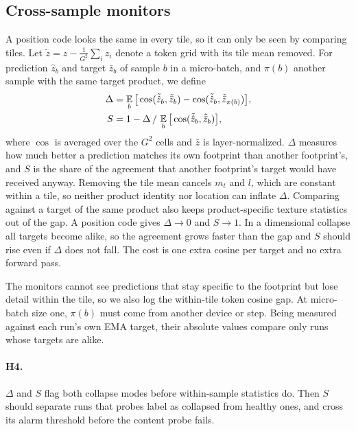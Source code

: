 \subsection{Cross-sample monitors}
\label{sec:monitor}

A position code looks the same in every tile, so it can only be seen by comparing tiles. Let $\tilde z = z - \frac{1}{G^2}\sum_i z_i$ denote a token grid with its tile mean removed. For prediction $\hat z_b$ and target $\bar z_b$ of sample $b$ in a micro-batch, and $\pi(b)$ another sample with the same target product, we define
\begin{align}
  \Delta &= \operatorname*{\mathbb{E}}_b\big[\cos(\tilde{\hat z}_b, \tilde{\bar z}_b) - \cos(\tilde{\hat z}_b, \tilde{\bar z}_{\pi(b)})\big], \label{eq:gap}\\
  S &= 1 - \Delta \,/\, \operatorname*{\mathbb{E}}_b\big[\cos(\tilde{\hat z}_b, \tilde{\bar z}_b)\big], \label{eq:share}
\end{align}
where $\cos$ is averaged over the $G^2$ cells and $\bar z$ is layer-normalized. $\Delta$ measures how much better a prediction matches its own footprint than another footprint's, and $S$ is the share of the agreement that another footprint's target would have received anyway. Removing the tile mean cancels $m_t$ and $l$, which are constant within a tile, so neither product identity nor location can inflate $\Delta$. Comparing against a target of the same product also keeps product-specific texture statistics out of the gap. A position code gives $\Delta\to0$ and $S\to1$. In a dimensional collapse all targets become alike, so the agreement grows faster than the gap and $S$ should rise even if $\Delta$ does not fall. The cost is one extra cosine per target and no extra forward pass.

The monitors cannot see predictions that stay specific to the footprint but lose detail within the tile, so we also log the within-tile token cosine gap. At micro-batch size one, $\pi(b)$ must come from another device or step. Being measured against each run's own EMA target, their absolute values compare only runs whose targets are alike.

\paragraph{H4.} $\Delta$ and $S$ flag both collapse modes before within-sample statistics do. Then $S$ should separate runs that probes label as collapsed from healthy ones, and cross its alarm threshold before the content probe fails.

